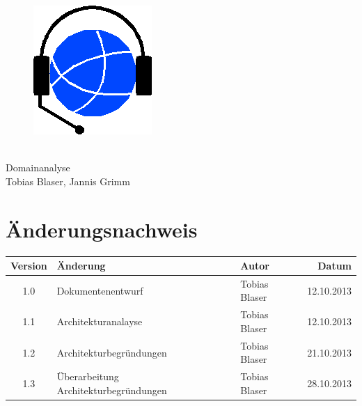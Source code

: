 







\providecommand{\documentType}{Domainanalyse}
\providecommand{\versionnumber}{1.0}



\thispagestyle{empty}
\begin{titlepage}
	\begin{center}

	\vspace*{40mm}
	
	\begin{figure}[htp]
		\centering
		\includegraphics[scale=0.60]{../img/icon-js-voip.png}
	\end{figure}		
	\vspace*{20mm}
	
	{\fontsize{40}{48} \selectfont \project \\[10mm]}
	{\fontsize{40}{48} \selectfont \documentType \\[5mm]}	
	\vspace*{20mm}
	Tobias Blaser, Jannis Grimm

\end{center}
\end{titlepage}
\clearpage

\chapter*{Änderungsnachweis}
\begin{tabularx}{\textwidth}{|cXlr|} %
		\hline
		\textbf{Version} & \textbf{Änderung} & \textbf{Autor} & \textbf{Datum}\\
		\hline
		1.0 & Dokumentenentwurf & Tobias Blaser & 12.10.2013\\
		1.1 & Architekturanalayse & Tobias Blaser & 12.10.2013\\
		1.2 & Architekturbegründungen & Tobias Blaser & 21.10.2013\\
		1.3 & Überarbeitung Architekturbegründungen & Tobias Blaser & 28.10.2013\\
		\hline
\end{tabularx}

\tableofcontents






